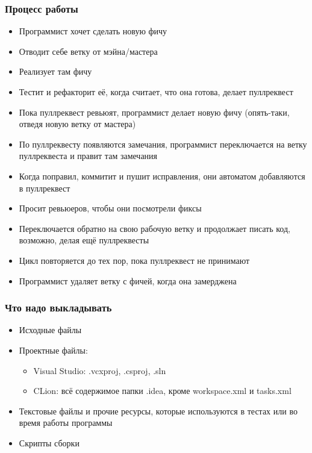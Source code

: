 \documentclass[xetex,mathserif,serif]{beamer}
\begin{document}
    \begin{frame}
        \frametitle{Процесс работы}
        \begin{footnotesize}
            \begin{itemize}
                \item Программист хочет сделать новую фичу
                \item Отводит себе ветку от мэйна/мастера
                \item Реализует там фичу
                \item Тестит и рефакторит её, когда считает, что она готова, делает пуллреквест
                \item Пока пуллреквест ревьюят, программист делает новую фичу (опять-таки, отведя новую ветку от мастера)
                \item По пуллреквесту появляются замечания, программист переключается на ветку пуллреквеста и правит там замечания
                \item Когда поправил, коммитит и пушит исправления, они автоматом добавляются в пуллреквест
                \item Просит ревьюеров, чтобы они посмотрели фиксы
                \item Переключается обратно на свою рабочую ветку и продолжает писать код, возможно, делая ещё пуллреквесты 
                \item Цикл повторяется до тех пор, пока пуллреквест не принимают
                \item Программист удаляет ветку с фичей, когда она замерджена
            \end{itemize}
        \end{footnotesize}
    \end{frame}

    \begin{frame}
        \frametitle{Что надо выкладывать}
        \begin{itemize}
            \item Исходные файлы
            \item Проектные файлы:
            \begin{itemize}
                \item Visual Studio: .vcxproj, .csproj, .sln
                \item CLion: всё содержимое папки .idea, кроме workspace.xml и tasks.xml
            \end{itemize}
            \item Текстовые файлы и прочие ресурсы, которые используются в тестах или во время работы программы
            \item Скрипты сборки
        \end{itemize}
    \end{frame}
\end{document}
